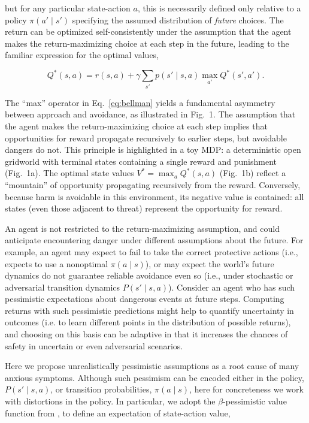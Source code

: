 \documentclass[11pt]{article} %
\begin{document}
but for any particular state-action $a$, this is necessarily defined only relative to a policy $\pi(a' \mid s')$ specifying the assumed distribution of \emph{future} choices. The return can be optimized self-consistently under the assumption that the agent makes the return-maximizing choice at each step in the future, leading to the familiar expression for the optimal values,

\begin{equation}\label{eq:bellman}
 Q^*(s,a) = r(s,a) + \gamma \sum_{s'} p(s' \mid s,a) \max_{a'} Q^*(s',a').
\end{equation}

The ``max'' operator in Eq.~\ref{eq:bellman} yields a fundamental asymmetry between approach and avoidance, as illustrated in Fig.~1. The assumption that the agent makes the return-maximizing choice at each step implies that opportunities for reward propagate recursively to earlier steps, but avoidable dangers do not. This principle is highlighted in a toy MDP: a deterministic open gridworld with terminal states containing a single reward and punishment (Fig.~1a). The optimal state values $V^* = \max_a Q^*(s,a)$ (Fig.~1b) reflect a ``mountain'' of opportunity propagating recursively from the reward. Conversely, because harm is avoidable in this environment, its negative value is contained: all states (even those adjacent to threat) represent the opportunity for reward.

An agent is not restricted to the return-maximizing assumption, and could anticipate encountering danger under different assumptions about the future. For example, an agent may expect to fail to take the correct protective actions (i.e., expects to use a nonoptimal $\pi(a \mid s)$), or may expect the world's future dynamics do not guarantee reliable avoidance even so (i.e., under stochastic or adversarial transition dynamics $P(s' \mid s,a)$). Consider an agent who has such pessimistic expectations about dangerous events at future steps. Computing returns with such pessimistic predictions might help to quantify uncertainty in outcomes (i.e. to learn different points in the distribution of possible returns)\cite{bellemare2017}, and choosing on this basis can be adaptive in that it increases the chances of safety in uncertain or even adversarial scenarios\cite{Garcia2015}. 

Here we propose unrealistically pessimistic assumptions as a root cause of many anxious symptoms. Although such pessimism can be encoded either in the policy, $P(s' \mid s,a)$, or transition probabilities, $\pi(a \mid s)$, here for concreteness we work with distortions in the policy. In particular, we adopt the $\beta$-pessimistic value function from \cite{Gaskett2003}, to define an expectation of state-action value,
\end{document}
